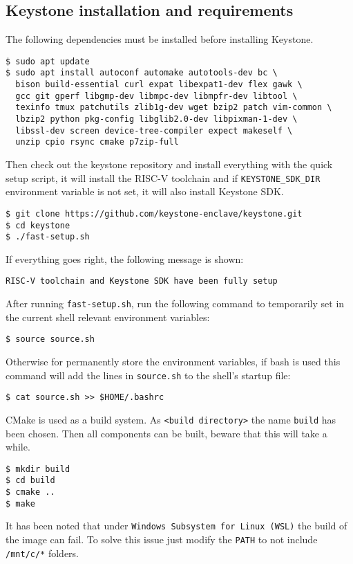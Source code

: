 \subsection{Keystone installation and requirements}
The following dependencies must be installed before installing Keystone. \\
\begin{lstlisting}[frame=single]
$ sudo apt update
$ sudo apt install autoconf automake autotools-dev bc \
  bison build-essential curl expat libexpat1-dev flex gawk \ 
  gcc git gperf libgmp-dev libmpc-dev libmpfr-dev libtool \ 
  texinfo tmux patchutils zlib1g-dev wget bzip2 patch vim-common \
  lbzip2 python pkg-config libglib2.0-dev libpixman-1-dev \
  libssl-dev screen device-tree-compiler expect makeself \
  unzip cpio rsync cmake p7zip-full
\end{lstlisting}
Then check out the keystone repository and install everything with the quick setup script, it will install the RISC-V toolchain and if \texttt{KEYSTONE\_SDK\_DIR} environment variable is not set, it will also install Keystone SDK. \\
\begin{lstlisting}[frame=single]
$ git clone https://github.com/keystone-enclave/keystone.git
$ cd keystone
$ ./fast-setup.sh
\end{lstlisting}
If everything goes right, the following message is shown: \\
\begin{lstlisting}[frame=single]
    RISC-V toolchain and Keystone SDK have been fully setup
\end{lstlisting}
After running \texttt{fast-setup.sh}, run the following command to temporarily set in the current shell relevant environment variables: \\
\begin{lstlisting}[frame=single]
$ source source.sh
\end{lstlisting}
Otherwise for permanently store the environment variables, if bash is used this command will add the lines in \texttt{source.sh} to the shell's startup file: \\
\begin{lstlisting}[frame=single]
$ cat source.sh >> $HOME/.bashrc
\end{lstlisting}
CMake \cite{cmake} is used as a build system. As \texttt{<build directory>} the name \texttt{build} has been chosen. Then all components can be built, beware that this will take a while. \\
\begin{lstlisting}[frame=single]
$ mkdir build
$ cd build
$ cmake ..
$ make
\end{lstlisting}
\begin{mybox}
\faExclamation\enspace It has been noted that under \texttt{Windows Subsystem for Linux (WSL)} the build of the image can fail. To solve this issue just modify the \texttt{PATH} to not include \texttt{/mnt/c/*} folders.
\end{mybox}

